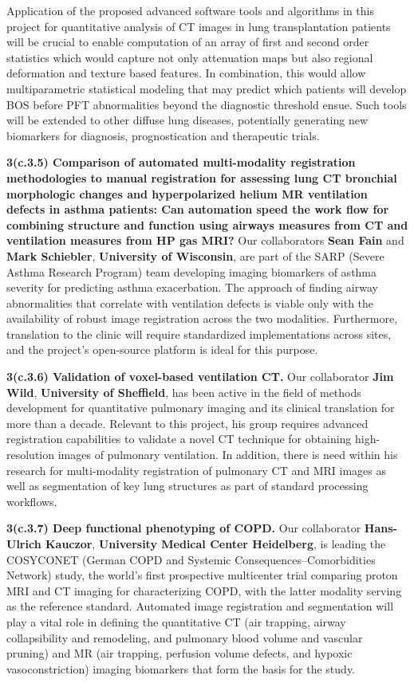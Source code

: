 \documentclass[11pt,]{article}
\begin{document}
Application of the proposed advanced software tools and algorithms in
this project for quantitative analysis of CT images in lung
transplantation patients will be crucial to enable computation of an
array of first and second order statistics which would capture not only
attenuation maps but also regional deformation and texture based
features. In combination, this would allow multiparametric statistical
modeling that may predict which patients will develop BOS before PFT
abnormalities beyond the diagnostic threshold ensue. Such tools will be
extended to other diffuse lung diseases, potentially generating new
biomarkers for diagnosis, prognostication and therapeutic trials.

\textbf{3(c.3.5) Comparison of automated multi-modality registration
methodologies to manual registration for assessing lung CT bronchial
morphologic changes and hyperpolarized helium MR ventilation defects in
asthma patients: Can automation speed the work flow for combining
structure and function using airways measures from CT and ventilation
measures from HP gas MRI?} Our collaborators \textbf{Sean Fain} and
\textbf{Mark Schiebler}, \textbf{University of Wisconsin}, are part of
the SARP (Severe Asthma Research Program) team developing imaging
biomarkers of asthma severity for predicting asthma exacerbation. The
approach of finding airway abnormalities that correlate with ventilation
defects is viable only with the availability of robust image
registration across the two modalities. Furthermore, translation to the
clinic will require standardized implementations across sites, and the
project's open-source platform is ideal for this purpose.

\textbf{3(c.3.6) Validation of voxel-based ventilation CT.} Our
collaborator \textbf{Jim Wild}, \textbf{University of Sheffield}, has
been active in the field of methods development for quantitative
pulmonary imaging and its clinical translation for more than a decade.
Relevant to this project, his group requires advanced registration
capabilities to validate a novel CT technique for obtaining
high-resolution images of pulmonary ventilation. In addition, there is
need within his research for multi-modality registration of pulmonary CT
and MRI images as well as segmentation of key lung structures as part of
standard processing workflows.

\textbf{3(c.3.7) Deep functional phenotyping of COPD.} Our collaborator
\textbf{Hans-Ulrich Kauczor}, \textbf{University Medical Center
Heidelberg}, is leading the COSYCONET (German COPD and Systemic
Consequences--Comorbidities Network) study, the world's first
prospective multicenter trial comparing proton MRI and CT imaging for
characterizing COPD, with the latter modality serving as the reference
standard. Automated image registration and segmentation will play a
vital role in defining the quantitative CT (air trapping, airway
collapsibility and remodeling, and pulmonary blood volume and vascular
pruning) and MR (air trapping, perfusion volume defects, and hypoxic
vasoconstriction) imaging biomarkers that form the basis for the study.
\end{document}
